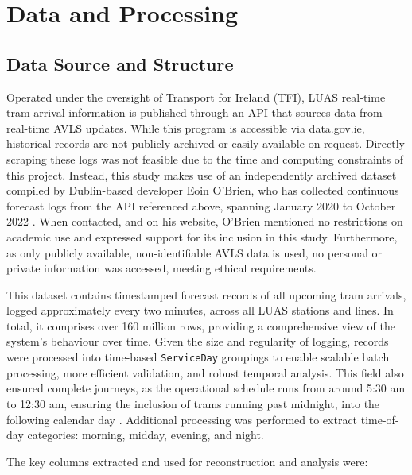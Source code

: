 \section*{Data and Processing}

\subsection*{Data Source and Structure}

    Operated under the oversight of Transport for Ireland (TFI), LUAS real-time tram arrival information is published through an API that sources data from real-time AVLS updates. While this program is accessible via data.gov.ie, historical records are not publicly archived or easily available on request. Directly scraping these logs was not feasible due to the time and computing constraints of this project. Instead, this study makes use of an independently archived dataset compiled by Dublin-based developer Eoin O’Brien, who has collected continuous forecast logs from the API referenced above, spanning January 2020 to October 2022 \parencite{obrien2022historical}. When contacted, and on his website, O’Brien mentioned no restrictions on academic use and expressed support for its inclusion in this study. Furthermore, as only publicly available, non-identifiable AVLS data is used, no personal or private information was accessed, meeting ethical requirements.

    This dataset contains timestamped forecast records of all upcoming tram arrivals, logged approximately every two minutes, across all LUAS stations and lines. In total, it comprises over 160 million rows, providing a comprehensive view of the system’s behaviour over time. Given the size and regularity of logging, records were processed into time-based \texttt{ServiceDay} groupings to enable scalable batch processing, more efficient validation, and robust temporal analysis. This field also ensured complete journeys, as the operational schedule runs from around 5:30 am to 12:30 am, ensuring the inclusion of trams running past midnight, into the following calendar day \parencite{tfi_luas}. Additional processing was performed to extract time-of-day categories: morning, midday, evening, and night.

    The key columns extracted and used for reconstruction and analysis were:

